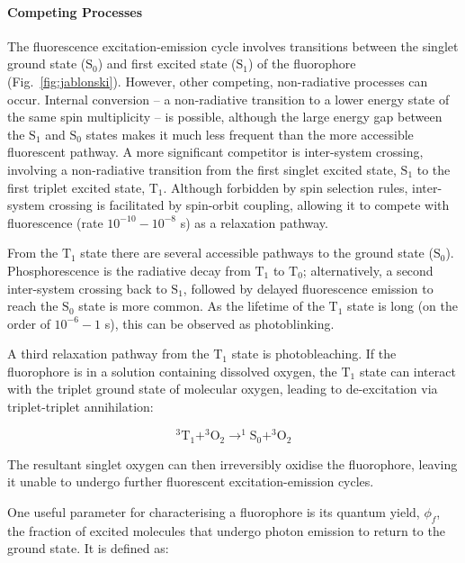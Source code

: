 \paragraph{Competing Processes}
The fluorescence excitation-emission cycle involves transitions between the singlet ground state ($\text{S}_0$) and first excited state ($\text{S}_1$) of the fluorophore (Fig.~\ref{fig:jablonski}). However, other competing, non-radiative processes can occur. Internal conversion -- a non-radiative transition to a lower energy state of the same spin multiplicity -- is possible, although the large energy gap between the $\text{S}_1$ and $\text{S}_0$ states makes it much less frequent than the more accessible fluorescent pathway. A more significant competitor is inter-system crossing, involving a non-radiative transition from the first singlet excited state, $\text{S}_1$ to the first triplet excited state, $\text{T}_1$. Although forbidden by spin selection rules, inter-system crossing is facilitated by spin-orbit coupling, allowing it to compete with fluorescence (rate $10^{-10} - 10^{-8}$ s) as a relaxation pathway.

From the $\text{T}_1$ state there are several accessible pathways to the ground state ($\text{S}_0$). Phosphorescence is the radiative decay from $\text{T}_1$ to $\text{T}_0$; alternatively, a second inter-system crossing back to $\text{S}_1$, followed by delayed fluorescence emission to reach the $\text{S}_0$ state is more common. As the lifetime of the $\text{T}_1$ state is long (on the order of $10^{-6} - 1$ s), this can be observed as photoblinking.  

A third relaxation pathway from the $\text{T}_1$ state is photobleaching. If the fluorophore is in a solution containing dissolved oxygen, the $\text{T}_1$ state can interact with the triplet ground state of molecular oxygen, leading to de-excitation via triplet-triplet annihilation:

\begin{equation}
^3\text{T}_1 + ^3\text{O}_2 \longrightarrow ^1\text{S}_0 + ^3\text{O}_2
\label{eq:blinking1}
\end{equation} 

The resultant singlet oxygen can then irreversibly oxidise the fluorophore, leaving it unable to undergo further fluorescent excitation-emission cycles.   


One useful parameter for characterising a fluorophore is its quantum yield, $\phi_f$, the fraction of excited molecules that undergo photon emission to return to the ground state. It is defined as: 


